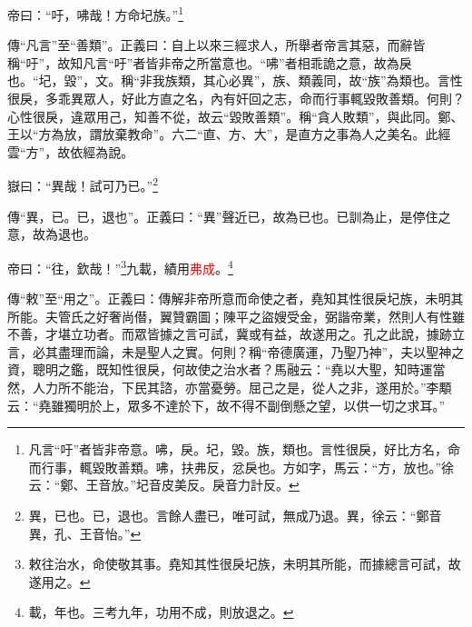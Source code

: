 帝曰：“吁，咈哉！方命圮族。”\footnote{凡言“吁”者皆非帝意。咈，戾。圮，毀。族，類也。言性很戾，好比方名，命而行事，輒毀敗善類。咈，扶弗反，忿戾也。方如字，馬云：“方，放也。”徐云：“鄭、王音放。”圮音皮美反。戾音力計反。}

{\noindent\zhuan{}\fzbyks 傳“凡言”至“善類”。正義曰：自上以來三經求人，所舉者帝言其惡，而辭皆稱“吁”，故知凡言“吁”者皆非帝之所當意也。“咈”者相乖詭之意，故為戾也。“圮，毀”，文。稱“非我族類，其心必異”，族、類義同，故“族”為類也。言性很戾，多乖異眾人，好此方直之名，內有奸回之志，命而行事輒毀敗善類。何則？心性很戾，違眾用己，知善不從，故云“毀敗善類”。稱“貪人敗類”，與此同。鄭、王以“方為放，謂放棄教命”。六二“直、方、大”，是直方之事為人之美名。此經雲“方”，故依經為說。 \par}

嶽曰：“異哉！試可乃已。”\footnote{異，已也。已，退也。言餘人盡已，唯可試，無成乃退。異，徐云：“鄭音異，孔、王音怡。”}

{\noindent\zhuan{}\fzbyks 傳“異，已。已，退也”。正義曰：“異”聲近已，故為已也。已訓為止，是停住之意，故為退也。 \par}

帝曰：“往，欽哉！”\footnote{敕往治水，命使敬其事。堯知其性很戾圮族，未明其所能，而據總言可試，故遂用之。}九載，績用\textcolor{red}{弗成}。\footnote{載，年也。三考九年，功用不成，則放退之。}

{\noindent\zhuan{}\fzbyks 傳“敕”至“用之”。正義曰：傳解非帝所意而命使之者，堯知其性很戾圮族，未明其所能。夫管氏之好奢尚僣，翼贊霸圖；陳平之盜嫂受金，弼諧帝業，然則人有性雖不善，才堪立功者。而眾皆據之言可試，冀或有益，故遂用之。孔之此說，據跡立言，必其盡理而論，未是聖人之實。何則？稱“帝德廣運，乃聖乃神”，夫以聖神之資，聰明之鑑，既知性很戾，何故使之治水者？馬融云：“堯以大聖，知時運當然，人力所不能治，下民其諮，亦當憂勞。屈己之是，從人之非，遂用於。”李顒云：“堯雖獨明於上，眾多不達於下，故不得不副倒懸之望，以供一切之求耳。” \par}

